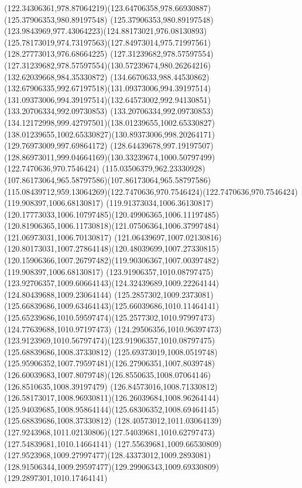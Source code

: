 {{	\curveto(122.34306361,978.87064219)(123.64706358,978.66930887)(125.37906353,980.89197548)
	\curveto(125.37906353,980.89197548)(123.9843969,977.43064223)(124.88173021,976.08130893)
	\curveto(125.78173019,974.73197563)(127.84973014,975.71997561)(128.27773013,976.68664225)
	\lineto(127.31239682,978.57597554)
	\curveto(127.31239682,978.57597554)(130.57239674,980.26264216)(132.62039668,984.35330872)
	\curveto(134.6670633,988.44530862)(132.67906335,992.67197518)(131.09373006,994.39197514)
	\curveto(131.09373006,994.39197514)(132.64573002,992.94130851)(133.20706334,992.09730853)
	\curveto(133.20706334,992.09730853)(134.12172998,999.42797501)(138.01239655,1002.65330827)
	\curveto(138.01239655,1002.65330827)(130.89373006,998.20264171)(129.76973009,997.69864172)
	\curveto(128.64439678,997.19197507)(128.86973011,999.04664169)(130.33239674,1000.50797499)
	\moveto(122.7470636,970.7546424)
	\curveto(115.03506379,962.23330928)(107.86173064,965.58797586)(107.86173064,965.58797586)
	\curveto(115.08439712,959.13064269)(122.7470636,970.7546424)(122.7470636,970.7546424)
	\moveto(119.908397,1006.68130817)
	\curveto(119.91373034,1006.36130817)(120.17773033,1006.10797485)(120.49906365,1006.11197485)
	\curveto(120.81906365,1006.11730818)(121.07506364,1006.37997484)(121.06973031,1006.70130817)
	\curveto(121.06439697,1007.02130816)(120.80173031,1007.27864148)(120.48039699,1007.27330815)
	\curveto(120.15906366,1007.26797482)(119.90306367,1007.00397482)(119.908397,1006.68130817)
	\moveto(123.91906357,1010.08797475)
	\curveto(123.92706357,1009.60664143)(124.32439689,1009.22264144)(124.80439688,1009.23064144)
	\curveto(125.2857302,1009.2373081)(125.66839686,1009.63464143)(125.66039686,1010.11464141)
	\curveto(125.65239686,1010.59597474)(125.2577302,1010.97997473)(124.77639688,1010.97197473)
	\curveto(124.29506356,1010.96397473)(123.9123969,1010.56797474)(123.91906357,1010.08797475)
	\moveto(125.68839686,1008.37330812)
	\curveto(125.69373019,1008.0519748)(125.95906352,1007.79597481)(126.27906351,1007.8039748)
	\curveto(126.60039683,1007.8079748)(126.8550635,1008.07064146)(126.8510635,1008.39197479)
	\curveto(126.84573016,1008.71330812)(126.58173017,1008.96930811)(126.26039684,1008.96264144)
	\curveto(125.94039685,1008.95864144)(125.68306352,1008.69464145)(125.68839686,1008.37330812)
	\moveto(128.40573012,1011.03064139)
	\curveto(127.9243968,1011.02130806)(127.54039681,1010.62797473)(127.54839681,1010.14664141)
	\curveto(127.55639681,1009.66530809)(127.9523968,1009.27997477)(128.43373012,1009.2893081)
	\curveto(128.91506344,1009.29597477)(129.29906343,1009.69330809)(129.2897301,1010.17464141)
}}
